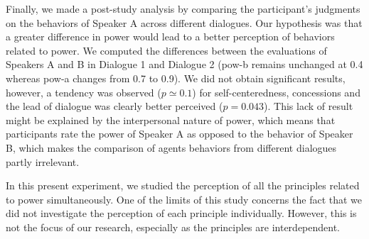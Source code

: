 \documentclass{llncs}
\begin{document}
	Finally, we made a post-study analysis by comparing the participant's judgments on the behaviors of Speaker A across different dialogues. Our hypothesis was that a greater difference in power would lead to a better perception of behaviors related to power. We computed the differences between the evaluations of Speakers A and B in Dialogue 1 and Dialogue 2 (pow-b remains unchanged at 0.4 whereas pow-a changes from 0.7 to 0.9). We did not obtain significant results, however, a tendency was observed ($p\simeq 0.1$) for 
	self-centeredness, concessions and the lead of dialogue was clearly better perceived ($p=0.043$). This lack of result might be explained by the interpersonal nature of power, which means that participants rate the power of Speaker A as opposed to the behavior of Speaker B, which makes the comparison of agents behaviors from different dialogues partly irrelevant.
	
	In this present experiment, we studied the perception of all the principles related to power simultaneously. One of the limits of this study concerns the fact that we did not investigate the perception of each principle individually. However, this is not the focus of our research, especially as the principles are interdependent.
	
\end{document}
